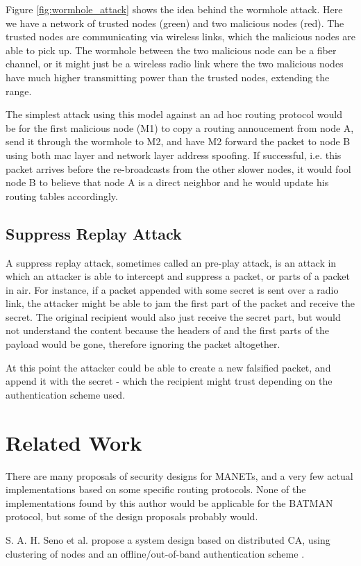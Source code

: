 Figure \ref{fig:wormhole_attack} shows the idea behind the wormhole attack. Here
we have a network of trusted nodes (green) and two malicious nodes (red). The
trusted nodes are communicating via wireless links, which the malicious nodes
are able to pick up. The wormhole between the two malicious node can be a fiber
channel, or it might just be a wireless radio link where the two malicious nodes
have much higher transmitting power than the trusted nodes, extending the range.

The simplest attack using this model against an ad hoc routing protocol would be
for the first malicious node (M1) to copy a routing annoucement from node A,
send it through the wormhole to M2, and have M2 forward the packet to node B
using both mac layer and network layer address spoofing. If successful, i.e.
this packet arrives before the re-broadcasts from the other slower nodes, it
would fool node B to believe that node A is a direct neighbor and he would
update his routing tables accordingly.

\subsection{Suppress Replay Attack}
A suppress replay attack, sometimes called an pre-play attack, is an attack in
which an attacker is able to intercept and suppress a packet, or parts of a
packet in air. For instance, if a packet appended with some secret is sent over
a radio link, the attacker might be able to jam the first part of the packet and
receive the secret. The original recipient would also just receive the secret
part, but would not understand the content because the headers of and the first
parts of the payload would be gone, therefore ignoring the packet altogether.

At this point the attacker could be able to create a new falsified packet, and
append it with the secret - which the recipient might trust depending on the
authentication scheme used.

\section{Related Work}
There are many proposals of security designs for \acp{MANET}, and a very few
actual implementations based on some specific routing protocols. None of the
implementations found by this author would be applicable for the BATMAN
protocol, but some of the design proposals probably would.

S. A. H. Seno et al. propose a system design based on distributed CA, using
clustering of nodes and an offline/out-of-band authentication scheme
\cite{hosseinisecure}.

